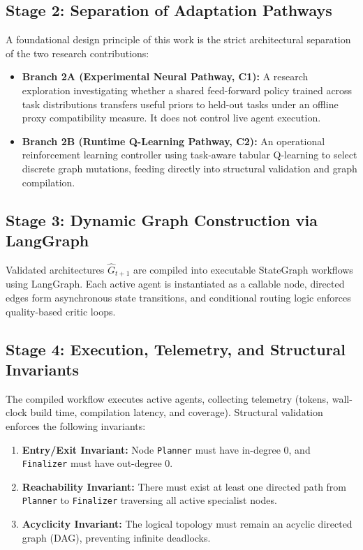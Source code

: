 \documentclass[conference]{IEEEtran}
\begin{document}
\subsection{Stage 2: Separation of Adaptation Pathways}
A foundational design principle of this work is the strict architectural separation of the two research contributions:
\begin{itemize}[leftmargin=*]
    \item \textbf{Branch 2A (Experimental Neural Pathway, C1):} A research exploration investigating whether a shared feed-forward policy trained across task distributions transfers useful priors to held-out tasks under an offline proxy compatibility measure. It does not control live agent execution.
    \item \textbf{Branch 2B (Runtime Q-Learning Pathway, C2):} An operational reinforcement learning controller using task-aware tabular Q-learning to select discrete graph mutations, feeding directly into structural validation and graph compilation.
\end{itemize}

\subsection{Stage 3: Dynamic Graph Construction via LangGraph}
Validated architectures $\widehat{G}_{t+1}$ are compiled into executable StateGraph workflows using LangGraph. Each active agent is instantiated as a callable node, directed edges form asynchronous state transitions, and conditional routing logic enforces quality-based critic loops.

\subsection{Stage 4: Execution, Telemetry, and Structural Invariants}
The compiled workflow executes active agents, collecting telemetry (tokens, wall-clock build time, compilation latency, and coverage). Structural validation enforces the following invariants:
\begin{enumerate}[leftmargin=*]
    \item \textbf{Entry/Exit Invariant:} Node \texttt{Planner} must have in-degree 0, and \texttt{Finalizer} must have out-degree 0.
    \item \textbf{Reachability Invariant:} There must exist at least one directed path from \texttt{Planner} to \texttt{Finalizer} traversing all active specialist nodes.
    \item \textbf{Acyclicity Invariant:} The logical topology must remain an acyclic directed graph (DAG), preventing infinite deadlocks.
\end{enumerate}
\end{document}
